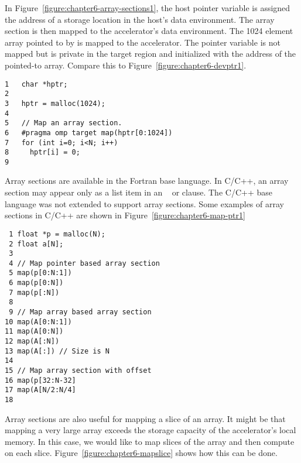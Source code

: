 In Figure~\ref{figure:chapter6-array-sections1}, the host pointer variable
 is assigned the address of a storage location in the host's data
environment.  The array section  is then mapped to the
accelerator's data environment.  The 1024 element array pointed to by  is
mapped to the accelerator.  The  pointer variable is not mapped but is
private in the target region and initialized with the address of the pointed-to
array. Compare this to Figure~\ref{figure:chapter6-devptr1}.

\begin{figure*}[!tbhp]
\begin{verbatim}
1   char *hptr;
2
3   hptr = malloc(1024);
4
5   // Map an array section.
6   #pragma omp target map(hptr[0:1024])
7   for (int i=0; i<N; i++)
8     hptr[i] = 0;
9   
\end{verbatim}
\caption{ \textbf {Map a pointer-based array section} -- \small
          Use an array section to map pointed-to memory.
         }
\label{figure:chapter6-array-sections1}
\end{figure*}

Array sections are available in the Fortran base language.  In C/C++, an
array section may appear only as a list item in an \OMP\  or
 clause.  The C/C++ base language was not extended to support
array sections.  Some examples of array sections in C/C++ are shown
in Figure~\ref{figure:chapter6-map-ptr1}

\begin{figure*}[!tbhp]
\begin{verbatim}
 1 float *p = malloc(N);
 2 float a[N];
 3
 4 // Map pointer based array section
 5 map(p[0:N:1]) 
 6 map(p[0:N])
 7 map(p[:N])
 8
 9 // Map array based array section
10 map(A[0:N:1])
11 map(A[0:N])
12 map(A[:N])
13 map(A[:]) // Size is N
14 
15 // Map array section with offset
16 map(p[32:N-32]
17 map(A[N/2:N/4]
18
\end{verbatim}
\caption{ \textbf {Array section syntax examples} -- \small
          Various usage of array section syntax in C and C++.
         }
\label{figure:chapter6-map-ptr1}
\end{figure*}

Array sections are also useful for mapping a slice of an array.  It might be
that mapping a very large array exceeds the storage capacity of the
accelerator's local memory.  In this case, we would like to map slices of the
array and then compute on each slice.  Figure~\ref{figure:chapter6-mapslice}
shows how this can be done.

